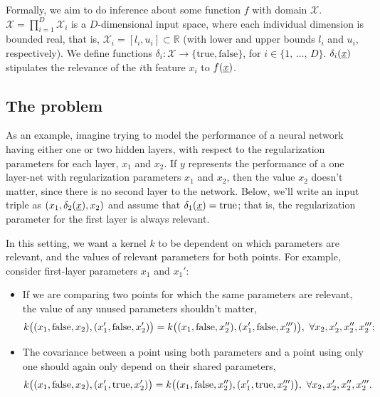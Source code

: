 \documentclass[landscape,a0b,final,a4resizeable]{include/a0poster}
\newcommand{\vect}[1]{\underline{\smash{#1}}}
\renewcommand{\v}[1]{\vect{#1}}
\newcommand{\reals}{\mathds{R}}
\newcommand{\sX}{\mathcal{X}}
\begin{document}
\begin{poster}
\begin{multicols}{3}
\vspace{0.5in}

Formally, we aim to do inference about some function $f$ with domain 
 $\sX$. $\sX = \prod_{i=1}^D \sX_i$ is a $D$-dimensional input space, where each individual dimension is bounded real, that is, $\sX_i = [l_i, u_i] \subset \reals$ (with lower and upper bounds $l_i$ and $u_i$, respectively). We define functions $\delta_i\colon \sX\to \{\text{true}, \text{false}\}$, for $i \in \{1,\,\ldots,\,D\}$. $\delta_i(\v{x})$ stipulates the relevance of the $i$th feature $x_i$ to 
  $f(\v{x})$.



\subsection{The problem}
\vspace{-0.05in}

As an example, imagine trying to model the performance of a neural network having either one or two hidden layers, with respect to the regularization parameters for each layer, $x_1$ and $x_2$.  If $y$ represents the performance of a one layer-net with regularization parameters $x_1$ and $x_2$, then the value $x_2$ doesn't matter, since there is no second layer to the network. Below, we'll write an input triple as $(x_1, \delta_2(\v{x}), x_2)$ and assume that $\delta_1(\v{x}) = \text{true}$; that is, the regularization parameter for the first layer is always relevant. 

In this setting, we want a kernel $k$ to be dependent on which parameters are relevant, and the values of relevant parameters for both points. For example, consider first-layer parameters $x_1$ and $x_1'$:
%
\begin{itemize}
\item If we are comparing two points for which the same parameters are relevant, the value of any unused parameters shouldn't matter,  
\begin{equation}
 k\bigl((x_1, \textnormal{false}, x_2), (x_1', \textnormal{false}, x_2') \bigr)
= k\bigl((x_1, \textnormal{false}, x_2''), (x_1', \textnormal{false}, x_2''')\bigr),\ 
\forall x_2, x_2', x_2'', x_2''';
\end{equation}
\item The covariance between a point using both parameters and a point using only one should again only depend on their shared parameters,
\begin{equation}
 k\bigl((x_1, \textnormal{false}, x_2), (x_1', \textnormal{true}, x_2') \bigr)
= k\bigl((x_1, \textnormal{false}, x_2''), (x_1', \textnormal{true}, x_2''')\bigr),\ 
\forall x_2, x_2', x_2'', x_2'''.
\end{equation}
\end{itemize}





\end{multicols}
\end{poster}
\end{document}
